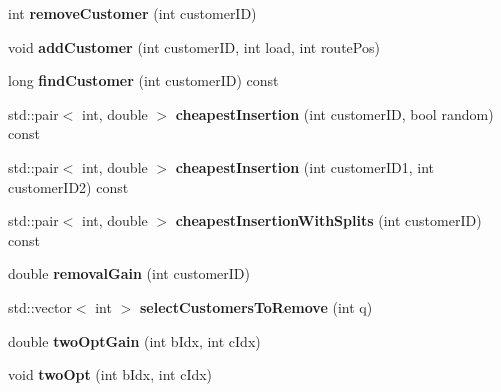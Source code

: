 \begin{DoxyCompactItemize}
\item 
\mbox{\label{class_vehicle_a6e9fa8957af9cec9ce1c43d6876aef1f}} 
int {\bfseries remove\+Customer} (int customer\+ID)
\item 
\mbox{\label{class_vehicle_a0bf2a5756305d6a25ec42859ebd0446e}} 
void {\bfseries add\+Customer} (int customer\+ID, int load, int route\+Pos)
\item 
\mbox{\label{class_vehicle_a6e8bb4ad5126e5b7ed6894a11400449e}} 
long {\bfseries find\+Customer} (int customer\+ID) const
\item 
\mbox{\label{class_vehicle_adb33f8fb253b1a07bc95222bbbe6c043}} 
std\+::pair$<$ int, double $>$ {\bfseries cheapest\+Insertion} (int customer\+ID, bool random) const
\item 
\mbox{\label{class_vehicle_abf82bff362dc1de38abed9ea458a273d}} 
std\+::pair$<$ int, double $>$ {\bfseries cheapest\+Insertion} (int customer\+I\+D1, int customer\+I\+D2) const
\item 
\mbox{\label{class_vehicle_aac0bd58150982e96f5ef36638a4c6ec4}} 
std\+::pair$<$ int, double $>$ {\bfseries cheapest\+Insertion\+With\+Splits} (int customer\+ID) const
\item 
\mbox{\label{class_vehicle_a87f565121f05f568af1b59b3506cb59a}} 
double {\bfseries removal\+Gain} (int customer\+ID)
\item 
\mbox{\label{class_vehicle_aed568174291108fd205254033927bbfd}} 
std\+::vector$<$ int $>$ {\bfseries select\+Customers\+To\+Remove} (int q)
\item 
\mbox{\label{class_vehicle_a7f113f2b4cc5a27a5aba32c38ef12237}} 
double {\bfseries two\+Opt\+Gain} (int b\+Idx, int c\+Idx)
\item 
\mbox{\label{class_vehicle_a31a85934417d72f5719b06ff1992a9d6}} 
void {\bfseries two\+Opt} (int b\+Idx, int c\+Idx)
\item 
\mbox{\label{class_vehicle_a07a9db33e4e1c2022eaa1031776b82a7}} 

\end{DoxyCompactItemize}
